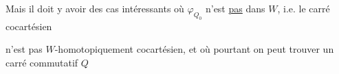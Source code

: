 Mais il doit y avoir des cas intéressants où $\varphi_{Q_0}$ n'est \uline{pas} dans $W$, i.e. le carré cocartésien


n'est pas $W$-homotopiquement cocartésien, et où pourtant on peut trouver un carré commutatif $Q$
